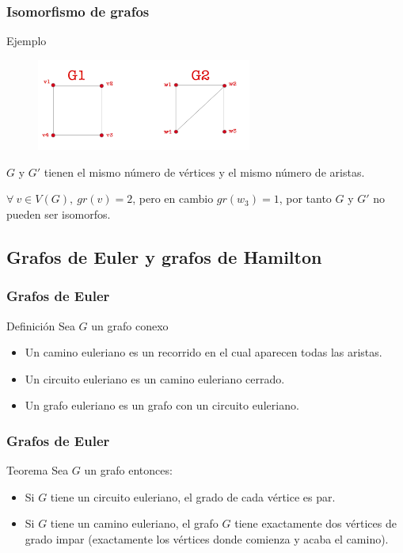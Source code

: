 \documentclass{beamer}
\begin{document}
\begin{frame}
\frametitle{Isomorfismo de grafos}
\begin{block}{Ejemplo}
\begin{figure}[h]
 \label{fig:volumen}
\centering
\includegraphics[height=3cm]{g9}
\end{figure}
$G$ y $G'$ tienen el mismo n\'umero de v\'ertices y el mismo n\'umero de aristas.

$\forall \ v\in V(G),\ gr(v) = 2$, pero en cambio $gr(w_3) = 1$, por tanto $G$ y $G'$ no pueden ser isomorfos. 
\end{block}
\end{frame}





\subsection{Grafos de Euler y grafos de Hamilton}

\begin{frame}
\frametitle{Grafos de Euler}
\begin{block}{Definici\'on}
Sea $G$ un grafo conexo
\begin{itemize}
\item Un camino euleriano es un recorrido en el cual aparecen todas las aristas. 
\item Un circuito euleriano es un camino euleriano cerrado.
\item Un grafo euleriano es un grafo con un circuito euleriano.
\end{itemize}
\end{block}
\end{frame}


\begin{frame}
\frametitle{Grafos de Euler}
\begin{block}{Teorema}
Sea $G$ un grafo entonces:
\begin{itemize}
\item Si $G$ tiene un circuito euleriano, el grado de cada v\'ertice es par.
\item Si $G$ tiene un camino euleriano, el grafo $G$ tiene exactamente dos v\'ertices de grado impar (exactamente los v\'ertices donde comienza y acaba el camino).
\end{itemize}
\end{block}
\end{frame}
\end{document}
